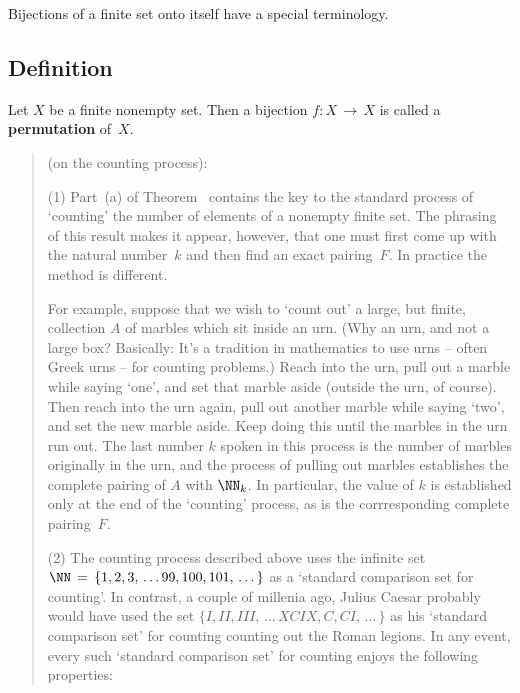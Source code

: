 \V
\V

        Bijections of a finite set onto itself have a special terminology.

            \subsection{\small{\bf Definition}}
            \label{DefA15.50}

\V

        Let $X$ be a finite nonempty set. Then a bijection $f:X \,{\rightarrow}\, X$ is called a {\bf permutation} of~$X$.

\VV

\begin{quotation}
{\footnotesize \underline{\Notes} (on the counting process):
    
        (1) Part~(a) of Theorem~ contains the key to the standard process of `counting' the number of elements of a nonempty finite set.
    The phrasing of this result makes it appear, however, that one must first come up with the natural number~$k$ and then find an exact pairing~$F$.
    In practice the method is different.

        For example, suppose that we wish to `count out' a large, but finite, collection $A$ of marbles which sit inside an urn.
    (Why an urn, and not a large box? Basically: It's a tradition in mathematics to use urns -- often Greek urns -- for counting problems.)
    Reach into the urn, pull out a marble while saying `one', and set that marble aside (outside the urn, of course).
    Then reach into the urn again, pull out another marble while saying `two', and set the new marble aside.
    Keep doing this until the marbles in the urn run out.
    The last number $k$ spoken in this process is the number of marbles originally in the urn,
    and the process of pulling out marbles establishes the complete pairing of $A$ with ${\NN}_{k}$.
    In particular, the value of $k$ is established only at the end of the `counting' process, as is the corrresponding complete pairing~$F$.

\V

        (2) The counting process described above uses the infinite set ${\NN} \,=\, \{1,2,3,\,{\ldots}\,99, 100, 101,\,{\ldots}\,\}$ as a `standard comparison set for counting'.
    In contrast, a couple of millenia ago, Julius Caesar probably would have used the set $\{I, II, III, \,{\ldots}\, XCIX, C, CI, \,{\ldots}\,\}$ as his `standard comparison set' for counting counting out the Roman legions.
    In any event, every such `standard comparison set' for counting enjoys the following properties:

}
\end{quotation}
